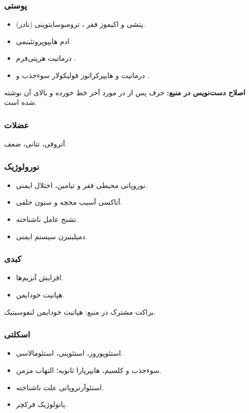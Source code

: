\documentclass[12pt,a4paper]{article}
\begin{document}
\subsubsection*{ پوستی}
\begin{itemize}
\item پتشی و اکیموز \CeliacArrow{} فقر ، ترومبوسایتوپنی (نادر).
\item ادم \CeliacArrow{} هایپوپروتئینمی.
\item درماتیت هرپتی‌فرم \CeliacArrow{} .
\item درماتیت و هایپرکراتوز فولیکولار \CeliacArrow{} سوءجذب  و .
\end{itemize}
\textbf{اصلاح دست‌نویس در منبع:} حرف پس از  در مورد آخر خط خورده و  بالای آن نوشته شده است.

\subsubsection*{ عضلات}
آتروفی، تتانی، ضعف.

\subsubsection*{ نورولوژیک}
\begin{itemize}
\item نوروپاتی محیطی \CeliacArrow{} فقر  و تیامین، اختلال ایمنی.
\item آتاکسی \CeliacArrow{} آسیب مخچه و ستون خلفی.
\item تشنج \CeliacArrow{} عامل ناشناخته.
\item دمیلینیزن \CeliacArrow{} سیستم ایمنی.
\end{itemize}

\subsubsection*{ کبدی}
\begin{itemize}
\item افزایش آنزیم‌ها.
\item هپاتیت خودایمن.
\end{itemize}
براکت مشترک در منبع: هپاتیت خودایمن لنفوسیتیک.

\subsubsection*{ اسکلتی}
\begin{itemize}
\item استئوپوروز، استئوپنی، استئومالاسی.
\item سوءجذب  و کلسیم، هایپرپارا ثانویه؛ التهاب مزمن.
\item استئوآرتروپاتی \CeliacArrow{} علت ناشناخته.
\item پاتولوژیک فرکچر.
\end{itemize}
\end{document}
